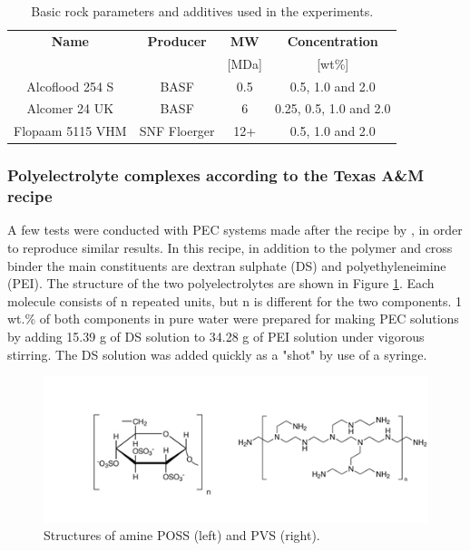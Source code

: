 \begin{table} 

\centering
\caption{Basic rock parameters and additives used in the experiments.}
\label{tab:crGels}
\begin{tabular}{c c c c } 
\toprule
\textbf{Name} & \textbf{Producer} & \textbf{MW} & \textbf{Concentration} \\ 
&& [MDa] & [wt\%]   \\
\midrule 
Alcoflood 254 S     & BASF    & 0.5 & 0.5, 1.0 and 2.0\\
Alcomer 24 UK       & BASF    & 6 & 0.25, 0.5, 1.0 and 2.0  \\ 
Flopaam 5115 VHM    & SNF Floerger    & 12+ & 0.5, 1.0 and 2.0  \\ 

\bottomrule
\end{tabular}
\end{table}

\subsubsection{Polyelectrolyte complexes according to the Texas A\&M recipe}
A few tests were conducted with PEC systems made after the recipe by \cite{Johnson2010}, in order to reproduce similar results. In this recipe, in addition to the polymer and cross binder  the main constituents are dextran sulphate (DS)  and polyethyleneimine (PEI). The structure of the two polyelectrolytes are shown in Figure \ref{fig:pei}. Each molecule consists of n repeated units, but n is different for the two components. 1 wt.\% of both components in pure water were prepared for making PEC solutions by adding 15.39 g of DS solution to 34.28 g of PEI solution under vigorous stirring. The DS solution was added quickly as a "shot" by use of a syringe.

\begin{figure}[h]
    \centering
    \includegraphics[width=\textwidth]{img/fig/pei.png}
    \caption{Structures of amine POSS (left) and PVS (right).}
    \label{fig:pei}
\end{figure}
 
